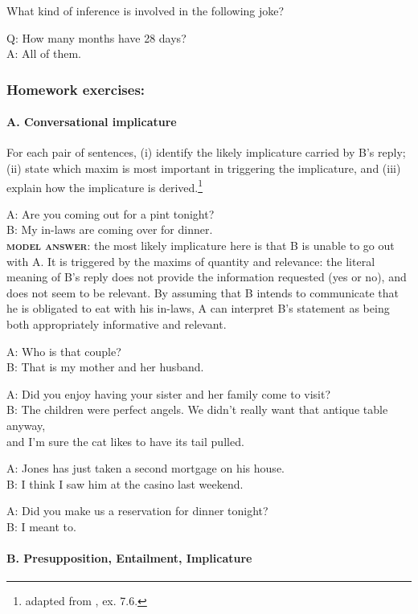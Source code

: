 What kind of inference is involved in the following joke?


\ea%
    \label{ex:key:6}
Q: How many months have 28 days? \\
A: All of them.    
\z

\subsubsection{Homework exercises:}\label{sec:}
\paragraph{A. Conversational implicature}

For each pair of sentences, (i) identify the likely implicature carried by B’s reply; (ii) state which maxim is most important in triggering the implicature, and (iii) explain how the implicature is derived.\footnote{adapted from \citet[226]{Saeed2009}, ex. 7.6.}

\ea
\ea  A: Are you coming out for a pint tonight?\\
  B: My in-laws are coming over for dinner.\\
\textsf{\textbf{\textsc{model answer}}}\textsf{: the most likely implicature here is that B is unable to go out with A. It is triggered by the maxims of quantity and relevance: the literal meaning of B’s reply does not provide the information requested (yes or no), and does not seem to be relevant. By assuming that B intends to communicate that he is obligated to eat with his in-laws, A can interpret B’s statement as being both appropriately informative and relevant.}

\ex  A: Who is that couple?\\
  B: That is my mother and her husband.

\ex  A: Did you enjoy having your sister and her family come to visit?\\
  B: The children were perfect angels. We didn’t really want that antique table anyway,\\
    and I’m sure the cat likes to have its tail pulled.

\ex  A: Jones has just taken a second mortgage on his house.\\
  B: I think I saw him at the casino last weekend.

\ex  A: Did you make us a reservation for dinner tonight?\\
  B: I meant to.
\z
\z

\paragraph{B. Presupposition, Entailment, Implicature}\footnotemark{}


